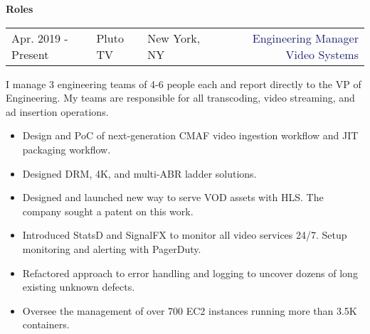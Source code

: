 \documentclass{article}
\begin{document}
\vspace{10pt}\textbf{Roles}

\vspace{5pt}\begin{tabularx}{\textwidth}{@{}lllXr}
  Apr. 2019 - Present&\textcolor{Mahogany}{Pluto TV}&\textcolor{Black!80}{New York, NY}&&\textcolor{MidnightBlue}{Engineering Manager Video Systems}
\end{tabularx}

\vspace{3pt} I manage 3 engineering teams of 4-6 people each and report directly to the VP of Engineering. My teams are responsible for
all transcoding, video streaming, and ad insertion operations.
\vspace{3pt}\begin{multicols}{2}
  \begin{small}
    \begin{itemize}[leftmargin=*,label=\tiny{$\bullet$}]
    \item\begin{minipage}[t]{\linewidth}{Design and PoC of next-generation CMAF video ingestion workflow and JIT packaging workflow.}\end{minipage}
    \item\begin{minipage}[t]{\linewidth}{Designed DRM, 4K, and multi-ABR ladder solutions.}\end{minipage}
    \item\begin{minipage}[t]{\linewidth}{Designed and launched new way to serve VOD assets with HLS. The company sought a patent on this work.}\end{minipage}
    \item\begin{minipage}[t]{\linewidth}{Introduced StatsD and SignalFX to monitor all video services 24/7. Setup monitoring
        and alerting with PagerDuty.}\end{minipage}
    \item\begin{minipage}[t]{\linewidth}{Refactored approach to error handling and logging to uncover dozens of long existing unknown defects.}\end{minipage}
    \item\begin{minipage}[t]{\linewidth}{Oversee the management of over 700 EC2 instances running more than 3.5K containers.}\end{minipage}

\end{itemize}
\end{small}
\end{multicols}
\end{document}
